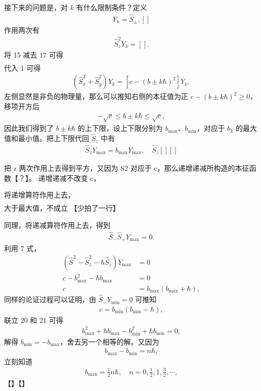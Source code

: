 接下来的问题是，对 $k$ 有什么限制条件？定义
\begin{align}
Y_k = \hat S_{\pm}, []
\end{align}
作用两次有
\begin{align}
    \hat S_z^2 Y_k = [].
\end{align}
将 {15} 减去 {17} 可得
\begin{align}
    [][]
\end{align}
代入 {1} 可得
\begin{align}
    (\hat S_x^2 + \hat S_y^2) Y_k = [c - (b \pm k\hbar)^2] Y_k, 
\end{align}
左侧显然是非负的物理量，那么可以推知右侧的本征值为正 $c-(b\pm k\hbar)^2 \geqslant 0$，移项开方后
\begin{align}
    -\sqrt c \leqslant b \pm k\hbar \leqslant \sqrt c,
\end{align}
因此我们得到了 $b \pm k\hbar$ 的上下限，设上下限分别为 $b_{\text{max}}$、$b_{\text{min}}$，对应于 $b_k$ 的最大值和最小值。把上下限代回 $\hat S_z$ 中有
\begin{align}
    \hat S_z Y_{\text{max}} = b_{\text{max}} Y_{\text{max}}, \quad \hat S_z [][]
\end{align}

把 z 两次作用上去得到平方，又因为 S2 对应于 c，那么递增递减所构造的本征函数【？】。
递增递减不改变 c，

将递增算符作用上去，
\begin{align}
    [][]
\end{align}
大于最大值，不成立
【少拍了一行】

同理，将递减算符作用上去，得到
\begin{align}
    \hat S_- \hat S_+ Y_{\text{max}} = 0. 
\end{align}
利用 {7} 式，
\begin{align}
    (\hat S^2 - \hat S_z^2 - \hbar \hat S_z) Y_{\text{max}} &= 0 \\
    c - b_{\text{max}} ^2 - \hbar b_{\text{max}} &= 0\\
    c &= b_{\text{max}} ( b_{\text{max}} + \hbar),
\end{align}
同样的论证过程可以证明，由 $\hat S_- Y_{\text{min}} = 0$ 可推知
\begin{align}
    c = b_{\text{min}} ( b_{\text{min}} - \hbar), 
\end{align}
联立 {20} 和 {21} 可得
\begin{align}
    b_{\text{max}}^2 + \hbar b_{\text{max}} - b_{\text{min}}^2 + \hbar b_{\text{min}} = 0,
\end{align}
解得 $b_{\text{min}} = - b_{\text{max}}$，舍去另一个相等的解。又因为
\begin{align}
    b_{\text{max}} - b_{\text{min}} = n\hbar, 
\end{align}
立刻知道
\begin{align}
    b_{\text{max}} = \frac12 n\hbar, \quad n = 0, \frac12, 1, \frac32, \cdots,
\end{align}
【】【】

